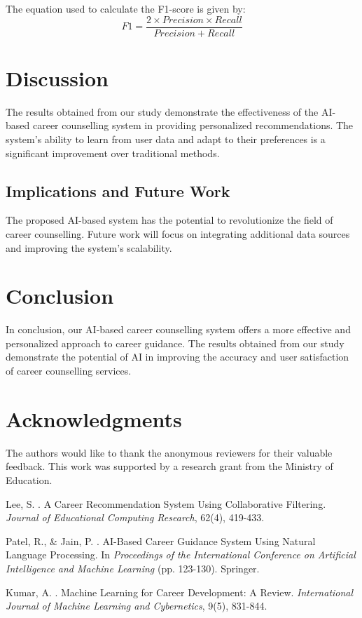\documentclass[12pt,a4paper]{article}
\begin{document}
The equation used to calculate the F1-score is given by:
\begin{equation}
F1 = \frac{2 \times Precision \times Recall}{Precision + Recall}
\end{equation}

\section{Discussion}
The results obtained from our study demonstrate the effectiveness of the AI-based career counselling system in providing personalized recommendations. The system's ability to learn from user data and adapt to their preferences is a significant improvement over traditional methods.

\subsection{Implications and Future Work}
The proposed AI-based system has the potential to revolutionize the field of career counselling. Future work will focus on integrating additional data sources and improving the system's scalability.

\section{Conclusion}
In conclusion, our AI-based career counselling system offers a more effective and personalized approach to career guidance. The results obtained from our study demonstrate the potential of AI in improving the accuracy and user satisfaction of career counselling services.

\section*{Acknowledgments}
The authors would like to thank the anonymous reviewers for their valuable feedback. This work was supported by a research grant from the Ministry of Education.


\begin{thebibliography}{99}

Lee, S. . A Career Recommendation System Using Collaborative Filtering. \emph{Journal of Educational Computing Research}, 62(4), 419-433.

Patel, R., \& Jain, P. . AI-Based Career Guidance System Using Natural Language Processing. In \emph{Proceedings of the International Conference on Artificial Intelligence and Machine Learning} (pp. 123-130). Springer.

Kumar, A. . Machine Learning for Career Development: A Review. \emph{International Journal of Machine Learning and Cybernetics}, 9(5), 831-844.

\end{thebibliography}
\end{document}
